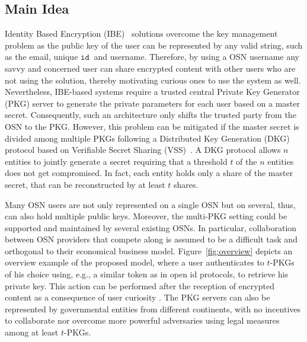 \documentclass[journal]{IEEEtran}
\newcommand{\figref}[1]{{Figure}~\ref{#1}}
\newcommand{\id}[1]{\ensuremath{\mathtt{id}_{#1}}}
\begin{document}
\subsection{Main Idea}

Identity Based Encryption (IBE)~\cite{DBLP:conf/crypto/Shamir84} solutions overcome the key management problem as the public key of the user can be represented by any valid string, such as the email, unique \id{}\ and username. Therefore, by using a OSN username any savvy and concerned user can share encrypted content with other users who are not using the solution, thereby motivating curious ones to use the system as well. Nevertheless, IBE-based systems require a trusted central Private Key Generator (PKG) server to generate the private parameters for each user based on a master secret. Consequently, such an architecture only shifts the trusted party from the OSN to the PKG. However, this problem can be mitigated if the master secret is divided among multiple PKGs following a Distributed Key Generation (DKG)~\cite{Pedersen:1991:NIS:646756.705507} protocol based on Verifiable Secret Sharing (VSS)~\cite{DBLP:conf/focs/ChorGMA85}. A DKG protocol allows $n$ entities to jointly generate a secret requiring that a threshold $t$ of the $n$ entities does not get compromised. In fact, each entity holds only a share of the master secret, that can be reconstructed by at least $t$ shares. 

Many OSN users are not only represented on a single OSN but on several, thus, can also hold multiple public keys. Moreover, the multi-PKG setting could be supported and maintained by several existing OSNs. In particular, collaboration between OSN providers that compete along is assumed to be a difficult task and orthogonal to their economical business model. 
\figref{fig:overview} depicts an overview example of the proposed model, where a user authenticates to $t$-PKGs of his choice using, e.g., a similar token as in open id protocols, to retrieve his private key. This action can be performed after the reception of encrypted content as a consequence of user curiosity .
The PKG servers can also be represented by governmental entities from different continents, with no incentives to collaborate nor overcome more powerful adversaries using legal measures~\cite{facebook-subpoena} among at least $t$-PKGs. 
\end{document}
